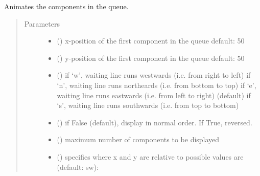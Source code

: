\documentclass[letterpaper,10pt,english]{sphinxmanual}
\begin{document}
\begin{fulllineitems}
\begin{fulllineitems}
\end{fulllineitems}


\begin{fulllineitems}
\label{\detokenize{Reference:salabim.Queue.animate}}
Animates the components in the queue.
\begin{quote}\begin{description}
\item[{Parameters}] \leavevmode\begin{itemize}
\item {} 
 () \textendash{} x-position of the first component in the queue 
default: 50

\item {} 
 () \textendash{} y-position of the first component in the queue 
default: 50

\item {} 
 () \textendash{} if ‘w’, waiting line runs westwards (i.e. from right to left) 
if ‘n’, waiting line runs northeards (i.e. from bottom to top) 
if ‘e’, waiting line runs eastwards (i.e. from left to right) (default) 
if ‘s’, waiting line runs southwards (i.e. from top to bottom)

\item {} 
 () \textendash{} if False (default), display in normal order. If True, reversed.

\item {} 
 () \textendash{} maximum number of components to be displayed

\item {} 
 () \textendash{} specifies where x and y are relative to 
possible values are (default: sw): 


\end{itemize}
\end{description}
\end{quote}
\end{fulllineitems}
\end{fulllineitems}
\end{document}
